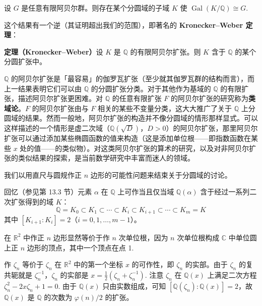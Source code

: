 \begin{corollary}\label{cor:14.28}
设 \(G\) 是任意有限阿贝尔群。则存在某个分圆域的子域 \(K\) 使 \(\operatorname{Gal}(K/\mathbb{Q}) \cong G\).
\end{corollary}

这个结果有一个逆（其证明超出我们的范围），即著名的 \textbf{Kronecker--Weber 定理}：

\noindent\textbf{定理（Kronecker--Weber）}\quad 设 \(K\) 是 \(\mathbb{Q}\) 的有限阿贝尔扩张。则 \(K\) 含于 \(\mathbb{Q}\) 的某个分圆扩张中。

\(\mathbb{Q}\) 的阿贝尔扩张是「最容易」的伽罗瓦扩张（至少就其伽罗瓦群的结构而言），而上一结果表明它们可以由 \(\mathbb{Q}\) 的分圆扩张分类。对于其他作为基域的 \(\mathbb{Q}\) 的有限扩张，描述阿贝尔扩张更困难。对 \(\mathbb{Q}\) 的任意有限扩张 \(F\) 的阿贝尔扩张的研究称为\textbf{类域论}。\(F\) 的阿贝尔扩张由与 \(F\) 相关的某些不变量分类，这大大推广了关于 \(\mathbb{Q}\) 上分圆域的结果。然而一般地，阿贝尔扩张的构造并不像分圆域的情形那样显式。可以这样描述的一个情形是虚二次域（\(\mathbb{Q}(\sqrt{D})\)，\(D > 0\)）的阿贝尔扩张，那里阿贝尔扩张可以通过添加某些椭圆函数的值来构造（这是添加单位根——即指数函数在某些 \(x\) 处的值——的类似物）。对这类阿贝尔扩张的算术的研究，以及对非阿贝尔扩张的类似结果的探索，是当前数学研究中丰富而迷人的领域。

我们以用直尺与圆规作正 \(n\) 边形的可能性问题来结束关于分圆域的讨论。

回忆（参见第 13.3 节）元素 \(\alpha\) 在 \(\mathbb{Q}\) 上可作当且仅当域 \(\mathbb{Q}(\alpha)\) 含于经过一系列二次扩张得到的域 \(K\)：
\begin{equation}
\mathbb{Q} = K_0 \subset K_1 \subset \cdots \subset K_i \subset K_{i+1} \subset \cdots \subset K_m = K \tag{14.12}
\end{equation}
其中 \([K_{i+1}:K_i] = 2\)（\(i = 0, 1, \ldots, m-1\)）。

在 \(\mathbb{R}^2\) 中作正 \(n\) 边形显然等价于作 \(n\) 次单位根，因为 \(n\) 次单位根构成 \(\mathbb{C}\) 中单位圆上正 \(n\) 边形的顶点，其中一个顶点在点 1.

作 \(\zeta_n\) 等价于 \(\zeta_n\) 在 \(\mathbb{R}^2\) 中的第一个坐标 \(x\) 的可作性，即 \(\zeta_n\) 的实部。由于 \(\zeta_n\) 的复共轭就是 \(\zeta_n^{-1}\)，\(\zeta_n\) 的实部是 \(x = \frac{1}{2}(\zeta_n+\zeta_n^{-1})\). 注意 \(\zeta_n\) 在 \(\mathbb{Q}(x)\) 上满足二次方程 \(\zeta_n^2-2x\zeta_n+1 = 0\). 由于 \(\mathbb{Q}(x)\) 只由实数组成，可知 \([\mathbb{Q}(\zeta_n):\mathbb{Q}(x)] = 2\)，故 \(\mathbb{Q}(x)\) 是 \(\mathbb{Q}\) 的次数为 \(\varphi(n)/2\) 的扩张。

